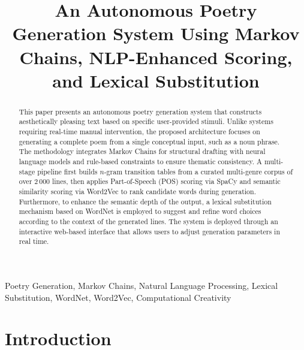 \documentclass[conference]{IEEEtran}
\begin{document}
\title{An Autonomous Poetry Generation System Using Markov Chains, NLP-Enhanced Scoring, and Lexical Substitution}

\author{
}

\maketitle

\begin{abstract}
This paper presents an autonomous poetry generation system that constructs aesthetically pleasing text based on specific user-provided stimuli. Unlike systems requiring real-time manual intervention, the proposed architecture focuses on generating a complete poem from a single conceptual input, such as a noun phrase. The methodology integrates Markov Chains for structural drafting with neural language models and rule-based constraints to ensure thematic consistency. A multi-stage pipeline first builds $n$-gram transition tables from a curated multi-genre corpus of over 2\,000 lines, then applies Part-of-Speech (POS) scoring via SpaCy and semantic similarity scoring via Word2Vec to rank candidate words during generation. Furthermore, to enhance the semantic depth of the output, a lexical substitution mechanism based on WordNet is employed to suggest and refine word choices according to the context of the generated lines. The system is deployed through an interactive web-based interface that allows users to adjust generation parameters in real time.
\end{abstract}

\begin{IEEEkeywords}
Poetry Generation, Markov Chains, Natural Language Processing, Lexical Substitution, WordNet, Word2Vec, Computational Creativity
\end{IEEEkeywords}

\section{Introduction}
\end{document}
